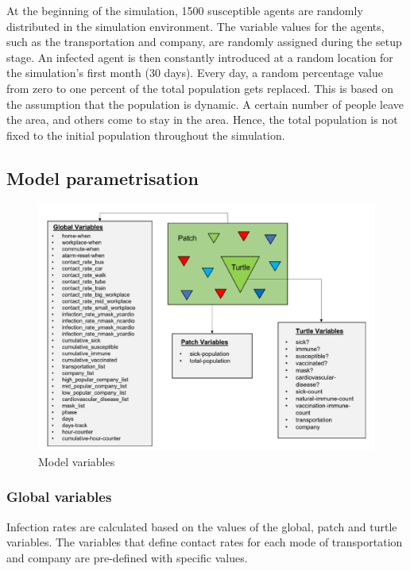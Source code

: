 \documentclass[smallextended]{svjour3}       %
\begin{document}
At the beginning of the simulation, 1500 susceptible agents are randomly distributed in the simulation environment. The variable values for the agents, such as the transportation and company, are randomly assigned during the setup stage. An infected agent is then constantly introduced at a random location for the simulation's first month (30 days). Every day, a random percentage value from zero to one percent of the total population gets replaced. This is based on the assumption that the population is dynamic. A certain number of people leave the area, and others come to stay in the area. Hence, the total population is not fixed to the initial population throughout the simulation.


\subsection{Model parametrisation}


\begin{figure}
	\centering
	\includegraphics[width=\linewidth]{figures/ModelVariables.png}
	\caption{Model variables \label{fig:modelvars}}	
\end{figure}



\subsubsection{Global variables}

Infection rates are calculated based on the values of the global, patch and turtle variables. The variables that define contact rates for each mode of transportation and company are pre-defined with specific values.
\end{document}
